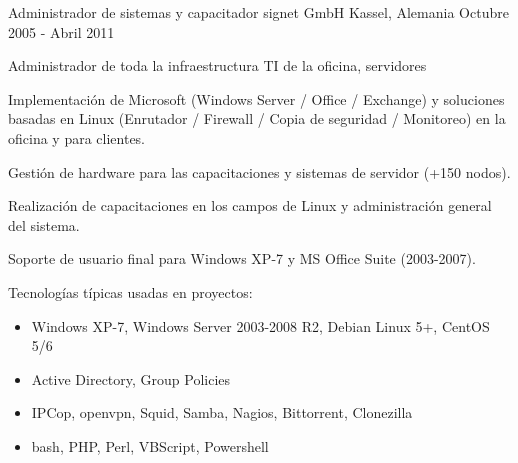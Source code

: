 \begin{cventries}
  \cventry
    {Administrador de sistemas y capacitador}
    {signet GmbH} %
    {Kassel, Alemania} %
    {Octubre 2005 - Abril 2011} %
    {
    \item Administrador de toda la infraestructura TI de la oficina, servidores
    \item Implementación de Microsoft (Windows Server / Office / Exchange) y soluciones basadas en Linux
    (Enrutador / Firewall / Copia de seguridad / Monitoreo) en la oficina y para clientes.
    \item Gestión de hardware para las capacitaciones y sistemas de servidor (+150 nodos).
    \item Realización de capacitaciones en los campos de Linux y administración general del sistema.
    \item Soporte de usuario final para Windows XP-7 y MS Office Suite (2003-2007).
    \item Tecnologías típicas usadas en proyectos:
      \begin{cvitems} %
          \begin{itemize}
            \item Windows XP-7, Windows Server 2003-2008 R2, Debian Linux 5+, CentOS 5/6
            \item Active Directory, Group Policies
            \item IPCop, openvpn, Squid, Samba, Nagios, Bittorrent, Clonezilla
            \item bash, PHP, Perl, VBScript, Powershell
          \end{itemize}
      \end{cvitems}
    }

\end{cventries}
